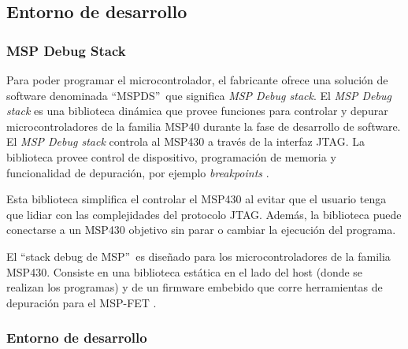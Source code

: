 

\subsection{Entorno de desarrollo}
\subsubsection{ MSP Debug Stack}

Para poder programar el microcontrolador, el fabricante ofrece una solución de software denominada \textquotedblleft MSPDS\textquotedblright \ que significa \textit{MSP Debug stack}. El \textit{MSP Debug stack} es una biblioteca dinámica que provee funciones para controlar y depurar microcontroladores de la familia MSP40 durante la fase de desarrollo de software. El \textit{MSP Debug stack} controla al MSP430 a través de la interfaz JTAG. La biblioteca provee control de dispositivo, programación de memoria y funcionalidad de depuración, por ejemplo \textit{breakpoints} \cite{GuideMSPStack}.

Esta biblioteca simplifica el controlar el MSP430 al evitar que el usuario tenga que lidiar con las complejidades del protocolo JTAG. Además, la biblioteca puede conectarse a un MSP430 objetivo sin parar o cambiar la ejecución del programa.


El \textquotedblleft stack debug de MSP\textquotedblright \ es diseñado para los microcontroladores de la familia MSP430. Consiste en una biblioteca estática en el lado del host (donde se realizan los programas) y de un firmware embebido que corre herramientas de depuración para el MSP-FET \cite{GuideMSPStack}.

\subsubsection{Entorno de desarrollo}

